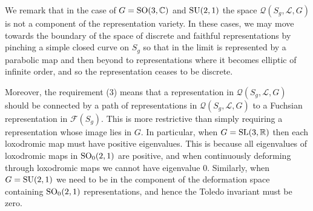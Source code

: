 \documentclass[11pt]{amsart}
\numberwithin{equation}{section}
\begin{document}
We remark that in the case of $G={\rm SO}(3,{\mathbb C})$ and ${\rm SU}(2,1)$ the space 
${\mathcal Q}(S_g,{\mathcal L},G)$ is not a component of the representation variety. In these cases, we may move
towards the boundary of the space of discrete and faithful representations by pinching a simple closed curve on $S_g$ so that
in the limit is represented by a parabolic map and then beyond to representations where it becomes elliptic of infinite order,
and so the representation ceases to be discrete. 



Moreover,  the requirement (3) means that a representation in ${\mathcal Q}(S_g,{\mathcal L}, G)$ should be connected
by a path of representations in ${\mathcal Q}(S_g,{\mathcal L},G)$ to a Fuchsian representation in
${\mathcal F}(S_g)$.
This is more restrictive than simply requiring a representation whose image lies in $G$. In particular, 
when $G={\rm SL}(3,{\mathbb R})$ then each loxodromic map must have positive eigenvalues. This is
because all eigenvalues of loxodromic maps in ${\rm SO}_0(2,1)$ are positive, and when continuously deforming
through loxodromic maps we cannot have eigenvalue $0$. Similarly, when $G={\rm SU}(2,1)$ we need to be
in the component of the deformation space containing ${\rm SO}_0(2,1)$ representations, and hence the
Toledo invariant must be zero.
\end{document}
